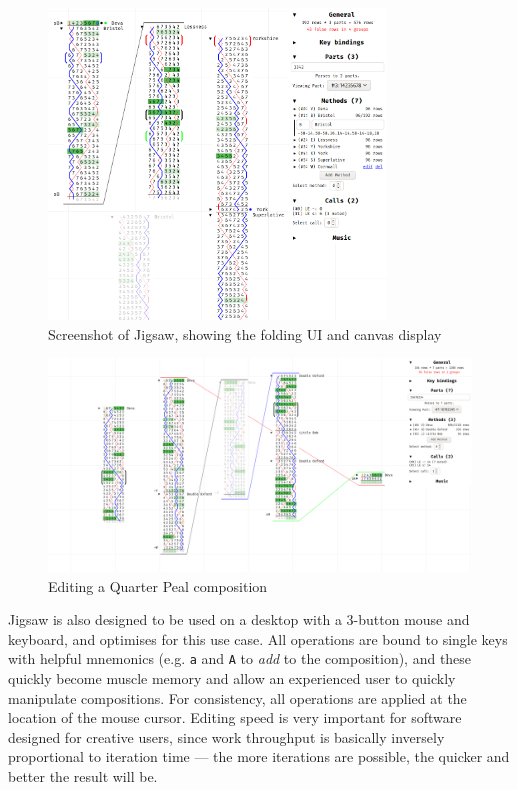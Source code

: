 \documentclass[12pt]{article}
\begin{document}
\begin{figure}
    \centering
    \includegraphics[width=0.8\textwidth]{current-screenshot-w-mute}
    \caption{Screenshot of Jigsaw, showing the folding UI and canvas
    display}\label{fig:cur-screenshot-2}
\end{figure}

\begin{figure}
    \centering
    \includegraphics[width=\textwidth]{false-qp}
    \caption{Editing a Quarter Peal composition}\label{fig:cur-screenshot}
\end{figure}

Jigsaw is also designed to be used on a desktop with a 3-button mouse and keyboard, and optimises
for this use case.  All operations are bound to single keys with helpful mnemonics (e.g. \verb|a|
and \verb|A| to \emph{add} to the composition), and these quickly become muscle memory and allow an
experienced user to quickly manipulate compositions.  For consistency, all operations are applied at
the location of the mouse cursor.  Editing speed is very important for software designed for
creative users, since work throughput is basically inversely proportional to iteration time --- the
more iterations are possible, the quicker and better the result will be.
\end{document}
